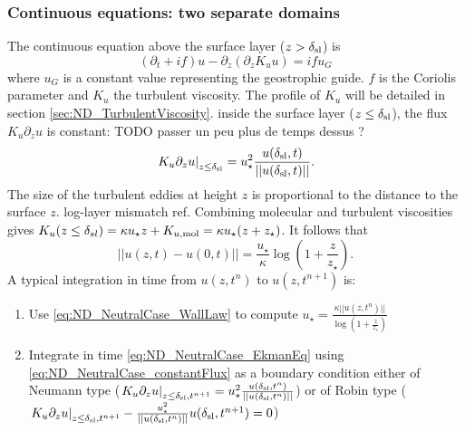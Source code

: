 \subsubsection{Continuous equations: two separate domains}
\label{sec:ND_NeutralCase}
The continuous equation above the surface layer
($z > \delta_{\rm sl}$) is
\begin{equation}
	\label{eq:ND_NeutralCase_EkmanEq}
  (\partial_t + if) u - \partial_z (\partial_z K_u u) = if u_G
\end{equation}
where $u_G$ is a constant value representing the geostrophic guide.
$f$ is the Coriolis parameter and $K_u$ the turbulent viscosity.
The profile of $K_u$ will be detailed
{\color{red}in section \ref{sec:ND_TurbulentViscosity}}.
inside the surface layer ($z \leq \delta_{\rm sl}$), the flux
$K_u \partial_z u$ is constant: {\color{red} TODO passer un peu plus de temps dessus ?}
\begin{equation}
	\label{eq:ND_NeutralCase_constantFlux}
	\left.K_u \partial_z u \right|_{z\leq \delta_{\rm sl}}
	= u_\star^2
	\frac{u(\delta_{\rm sl}, t)}{||u(\delta_{\rm sl}, t)||}.
\end{equation}
The size of the turbulent eddies at height $z$
is proportional to the distance to the surface $z$.
{\color{red} log-layer mismatch ref}. Combining molecular and
turbulent viscosities gives 
$K_u(z\leq \delta_{sl}) = \kappa u_\star z + K_{u, {\rm mol}}
= \kappa u_\star (z + z_{\star})$.
It follows that
\begin{equation}
\label{eq:ND_NeutralCase_WallLaw}
	||u(z, t) - u(0, t)|| = \frac{{u_\star}}{\kappa}
	\log(1+\frac{z}{z_{\star}}).
\end{equation}
A typical integration in time from $u(z, t^{n})$ to
$u(z, t^{n+1})$ is:
\begin{enumerate}
  \item Use \eqref{eq:ND_NeutralCase_WallLaw} to compute 
	  $u_\star = \frac{\kappa ||u(z, t^n)||}
			{\log(1+\frac{z}{z_\star})}$
  \item Integrate in time \eqref{eq:ND_NeutralCase_EkmanEq}
  using \eqref{eq:ND_NeutralCase_constantFlux} as a boundary condition
		either of Neumann type ($\left.K_u \partial_z u
		\right|_{z\leq \delta_{\rm sl}, t^{n+1}}
	= u_\star^2 \frac{u(\delta_{\rm sl}, t^n)}
		{||u(\delta_{\rm sl}, t^n)||}$)
		or of Robin type ($\left.K_u \partial_z u
		\right|_{z\leq \delta_{\rm sl}, t^{n+1}}
		- \frac{u_\star^2} {||u(\delta_{\rm sl}, t^n)||}
		u(\delta_{\rm sl}, t^{n+1}) = 0$)
\end{enumerate}


